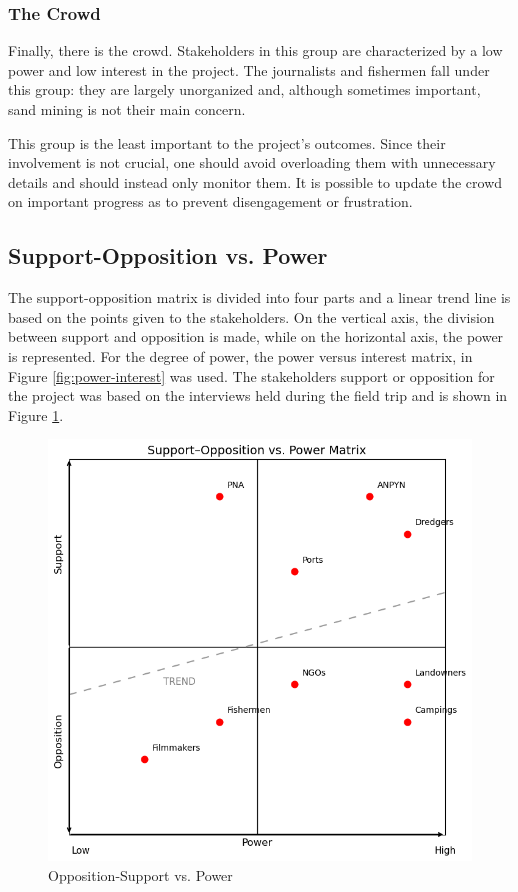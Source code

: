 \subsubsection{The Crowd}
Finally, there is the crowd. Stakeholders in this group are characterized by a low power and low interest in the project. The journalists and fishermen fall under this group: they are largely unorganized and, although sometimes important, sand mining is not their main concern.

This group is the least important to the project's outcomes. Since their involvement is not crucial, one should avoid overloading them with unnecessary details and should instead only monitor them. It is possible to update the crowd on important progress as to prevent disengagement or frustration.


\subsection{Support-Opposition vs. Power}

The support-opposition matrix is divided into four parts and a linear trend line is based on the points given to the stakeholders. On the vertical axis, the division between support and opposition is made, while on the horizontal axis, the power is represented. For the degree of power, the power versus interest matrix, in Figure \ref{fig:power-interest} was used. The stakeholders support or opposition for the project was based on the interviews held during the field trip and is shown in Figure \ref{fig:support-opposition-power}.



\begin{figure}[H]
    \centering
    \includegraphics[width=0.70\linewidth]{figures/Support-OppositionVSPower.png}
    \caption{Opposition-Support vs. Power}
    \label{fig:support-opposition-power}
\end{figure}

